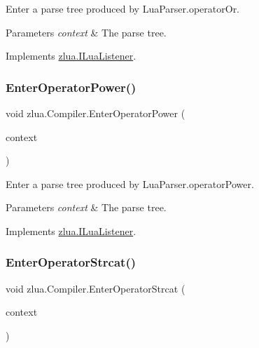 Enter a parse tree produced by Lua\+Parser.\+operator\+Or. 


\begin{DoxyParams}{Parameters}
{\em context} & The parse tree.\\
\hline
\end{DoxyParams}


Implements \mbox{\hyperlink{interfacezlua_1_1_i_lua_listener_a9e722ddbc7e68d0fc367518365257711}{zlua.\+I\+Lua\+Listener}}.

\mbox{\label{classzlua_1_1_compiler_a3e4509b5b2b44e581499d2264cf0e22f}} 
\subsubsection{\texorpdfstring{Enter\+Operator\+Power()}{EnterOperatorPower()}}
{\footnotesize\ttfamily void zlua.\+Compiler.\+Enter\+Operator\+Power (\begin{DoxyParamCaption}\item[{\mbox{[}\+Not\+Null\mbox{]} \mbox{\hyperlink{classzlua_1_1_lua_parser_1_1_operator_power_context}{Lua\+Parser.\+Operator\+Power\+Context}}}]{context }\end{DoxyParamCaption})}



Enter a parse tree produced by Lua\+Parser.\+operator\+Power. 


\begin{DoxyParams}{Parameters}
{\em context} & The parse tree.\\
\hline
\end{DoxyParams}


Implements \mbox{\hyperlink{interfacezlua_1_1_i_lua_listener_ac3dc9682198e2059e103552b21ef1a9c}{zlua.\+I\+Lua\+Listener}}.

\mbox{\label{classzlua_1_1_compiler_a9e79fbc0bd20b36c90d0b53569a1f7d7}} 
\subsubsection{\texorpdfstring{Enter\+Operator\+Strcat()}{EnterOperatorStrcat()}}
{\footnotesize\ttfamily void zlua.\+Compiler.\+Enter\+Operator\+Strcat (\begin{DoxyParamCaption}\item[{\mbox{[}\+Not\+Null\mbox{]} \mbox{\hyperlink{classzlua_1_1_lua_parser_1_1_operator_strcat_context}{Lua\+Parser.\+Operator\+Strcat\+Context}}}]{context }\end{DoxyParamCaption})}



